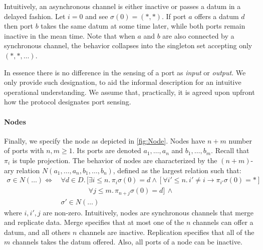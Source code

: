 Intuitively, an asynchronous channel is either inactive or passes a datum in a delayed fashion.
Let $i=0$ and see $\sigma(0)=(*,*)$.
If port $a$ offers a datum $d$ then port $b$  takes the same datum at some time later,
while both ports remain inactive in the mean time. Note that when $a$ and $b$ are also
connected by a synchronous channel, the behavior collapses into the singleton set accepting only $(*,*,\ldots)$.

In essence there is no difference in the sensing of a port as \emph{input} or \emph{output}.
We only provide such designation, to aid the informal description for an intuitive operational understanding.
We assume that, practically, it is agreed upon upfront how the protocol designates port sensing.

\paragraph{Nodes}

Finally, we specify the node as depicted in \ref{fig:Node}.
Nodes have $n+m$ number of ports with $n,m\geq1$.
Its ports are denoted $a_1,\ldots,a_n$ and $b_1,\ldots,b_m$.
Recall that $\pi_i$ is tuple projection.
The behavior of nodes are characterized by the $(n+m)$-ary relation $N(a_1,\ldots,a_n,b_1,\ldots,b_n)$,
defined as the largest relation such that:
\begin{align*}
	\sigma\in N(\ldots)\Leftrightarrow\, & \forall d\in D.\,
	\bigl[\exists i\leq n.\,\pi_i\sigma(0) = d\land\left[\forall i'\leq n.\,i'\neq i\rightarrow\pi_{i'}\sigma(0) = *\right]\\
	& \phantom{\forall d\in D.\, \bigl[}\forall j\leq m.\,\pi_{n+j}\sigma(0)=d\bigr]\,\land\\
	& \sigma'\in N(\ldots)
\end{align*}
where $i,i',j$ are non-zero.
Intuitively, nodes are synchronous channels that merge and replicate data.
Merge specifies that at most one of the $n$ channels can offer a datum,
and all others $n$ channels are inactive.
Replication specifies that all of the $m$ channels takes the datum offered.
Also, all ports of a node can be inactive.
